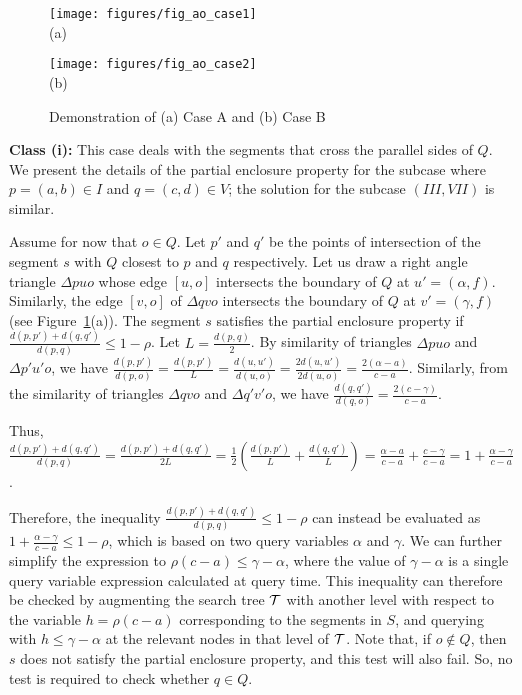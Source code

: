 \begin{figure}[h]
\begin{minipage}[b]{0.5\linewidth}
\centering
\texttt{[image: figures/fig\_ao\_case1]}\\
(a)
\end{minipage}
\begin{minipage}[b]{0.5\linewidth}
\centering
\texttt{[image: figures/fig\_ao\_case2]}\\
(b)
\end{minipage}
\caption{Demonstration of (a) Case A and (b) Case B}
\label{fig:rectangles:ao:case12}
\end{figure}



{\bf Class (i):}
This case deals with the segments that cross the parallel sides of $Q$. 
We present the details of the partial enclosure property for the subcase 
where $p=(a,b) \in I$ and $q=(c,d) \in V$; the solution for the subcase 
$(III, VII)$ is similar.

Assume for now that $o \in Q$. Let 
$p'$ and $q'$ be the points of intersection of the segment $s$ with 
$Q$ closest to $p$  and $q$ respectively. Let us draw a right angle 
triangle $\Delta p u o$ whose edge $[u,o]$ intersects the boundary 
of $Q$ at $u'=(\alpha, f)$. Similarly, the edge $[v,o]$ of  
$\Delta q v o$  intersects the boundary of $Q$ at 
$v' = (\gamma, f)$ (see Figure~\ref{fig:rectangles:ao:case12}(a)). 
The segment $s$ satisfies the partial enclosure property if 
$\frac{d(p, p') + d(q, q')}{d(p, q)} \leq 1 - \rho$. Let $L = \frac{d(p,q)}{2}$. By similarity 
of triangles $\Delta puo$ and $\Delta p'u'o$, we have
$\frac{d(p, p')}{d(p, o)} = \frac{d(p, p')}{L} = 
\frac{d(u, u')}{d(u, o)} = \frac{2 d(u, u')}{2 d(u, o)} = 
\frac{2(\alpha - a)}{c - a}$. Similarly, from the similarity of 
triangles $\Delta qvo$ and $\Delta q'v'o$, we have
$\frac{d(q, q')}{d(q, o)} = \frac{2(c - \gamma)}{c - a}$.

Thus, $\frac{d(p,p')+d(q,q')}{d(p,q)}=\frac{d(p,p')+d(q,q')}{2L} = 
\frac{1}{2} \left ( \frac{d(p,p')}{L} + \frac{d(q,q')}{L} \right ) 
 = \frac{\alpha - a}{c - a} + \frac{c - \gamma}{c - a} 
= 1 + \frac{\alpha - \gamma}{c - a}$. 

Therefore, the inequality $\frac{d(p, p') + d(q, q')}{d(p, q)} 
\leq 1 - \rho$ can instead be evaluated as $1 + \frac{\alpha - 
\gamma}{c - a} \leq 1 - \rho$, which is based on two query 
variables $\alpha$ and $\gamma$. We can further simplify the 
expression to $\rho(c - a) \leq \gamma - \alpha$, where the value 
of $\gamma - \alpha$ is a single query variable expression 
calculated at query time. This inequality can therefore be checked 
by augmenting the search tree $\cal T$ with another level with 
respect to the variable $h=\rho(c-a)$ corresponding to the segments 
in $S$, and querying with $h \leq \gamma-\alpha$ at the relevant 
nodes in that level of $\cal T$. Note that, if $o \not\in Q$, then 
$s$ does not satisfy the partial enclosure property, and this test 
will also fail. So, no test is required to check whether $q \in Q$.



